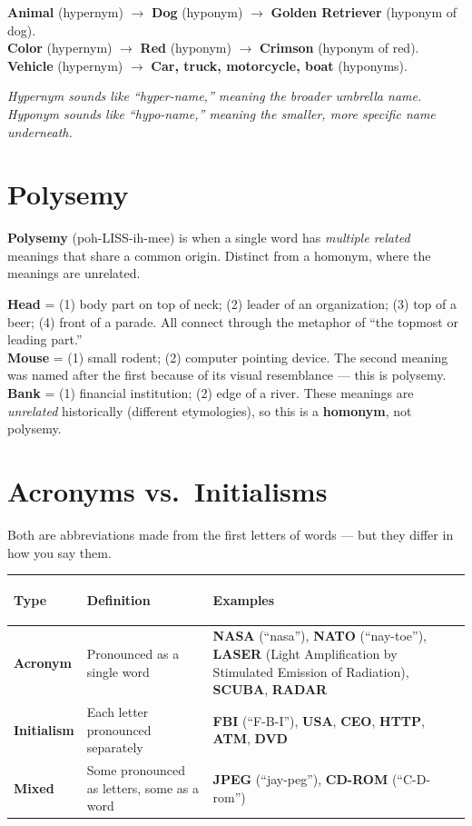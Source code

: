 \documentclass[11pt, letterpaper]{article}
\newcommand{\example}[1]{%
  \begin{tcolorbox}[colback=exbg, colframe=exborder,
    title={\bfseries Example}, arc=3pt, boxrule=1pt]
  #1
  \end{tcolorbox}%
}
\begin{document}
\example{
\textbf{Animal} (hypernym) $\to$ \textbf{Dog} (hyponym) $\to$ \textbf{Golden Retriever} (hyponym of dog).\\[4pt]
\textbf{Color} (hypernym) $\to$ \textbf{Red} (hyponym) $\to$ \textbf{Crimson} (hyponym of red).\\[4pt]
\textbf{Vehicle} (hypernym) $\to$ \textbf{Car, truck, motorcycle, boat} (hyponyms).
}

\textit{Hypernym sounds like ``hyper-name,'' meaning the broader umbrella name. Hyponym sounds like ``hypo-name,'' meaning the smaller, more specific name underneath.}

\section*{Polysemy}

\textbf{Polysemy} (poh-LISS-ih-mee) is when a single word has \emph{multiple related} meanings
that share a common origin. Distinct from a homonym, where the meanings are unrelated.

\example{
\textbf{Head} = (1) body part on top of neck; (2) leader of an organization; (3) top of a beer; (4) front of a parade. All connect through the metaphor of ``the topmost or leading part.''\\[4pt]
\textbf{Mouse} = (1) small rodent; (2) computer pointing device. The second meaning was named after the first because of its visual resemblance --- this is polysemy.\\[4pt]
\textbf{Bank} = (1) financial institution; (2) edge of a river. These meanings are \emph{unrelated} historically (different etymologies), so this is a \textbf{homonym}, not polysemy.
}

\section*{Acronyms vs.\ Initialisms}

Both are abbreviations made from the first letters of words --- but they differ in how you say them.

\noindent
{\renewcommand{\arraystretch}{1.6}
\begin{tabularx}{\textwidth}{>{\bfseries\raggedright\arraybackslash}p{3cm}
                              >{\raggedright\arraybackslash}X
                              >{\raggedright\arraybackslash}X}
\toprule
\rowcolor{tableheadergreen}
\textbf{Type} & \textbf{Definition} & \textbf{Examples} \\
\midrule
\rowcolor{rowA}  \textbf{Acronym} & Pronounced as a single word & \textbf{NASA} (``nasa''), \textbf{NATO} (``nay-toe''), \textbf{LASER} (Light Amplification by Stimulated Emission of Radiation), \textbf{SCUBA}, \textbf{RADAR} \\
\rowcolor{rowBg} \textbf{Initialism} & Each letter pronounced separately & \textbf{FBI} (``F-B-I''), \textbf{USA}, \textbf{CEO}, \textbf{HTTP}, \textbf{ATM}, \textbf{DVD} \\
\rowcolor{rowA}  \textbf{Mixed} & Some pronounced as letters, some as a word & \textbf{JPEG} (``jay-peg''), \textbf{CD-ROM} (``C-D-rom'') \\
\bottomrule
\end{tabularx}}
\end{document}
